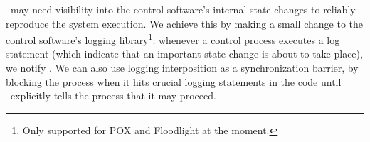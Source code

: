 \projectname~may need visibility into the control software's internal state
changes to reliably reproduce the system execution. We achieve this by
making a
small change to the control software's logging library\footnote{Only supported
for POX and Floodlight at the moment.}: whenever a control process executes a log
statement (which indicate that an important state change is about to take
place), we notify \projectname. We can also use logging interposition as a
synchronization barrier, by blocking the process when it hits crucial logging statements in the code
until \projectname~explicitly tells the process that it may proceed.

%
%
%
%
%
%

